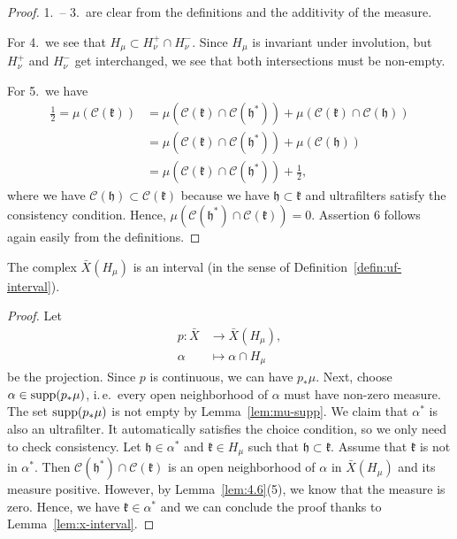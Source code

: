 \begin{proof}
  1.\ -- 3.\ are clear from the definitions and the additivity of the measure.

  For 4.\ we see that \(H_\mu \subset H_\nu^+ \cap H_\nu^-\). Since \(H_\mu\) is invariant under involution, but \(H_\nu^+\) and \(H_\nu^-\) get interchanged, we see that both intersections must be non-empty.

  For 5.\ we have
  \begin{align*}
    \frac{1}{2} = \mu(\mathcal{C}(\mathfrak{k}))
    & = \mu(\mathcal{C}(\mathfrak{k}) \cap \mathcal{C}(\mathfrak{h^\ast})) + \mu(\mathcal{C}(\mathfrak{k}) \cap \mathcal{C}(\mathfrak{h}))\\
    & = \mu(\mathcal{C}(\mathfrak{k}) \cap \mathcal{C}(\mathfrak{h^\ast})) + \mu(\mathcal{C}(\mathfrak{h}))\\
    & = \mu(\mathcal{C}(\mathfrak{k}) \cap \mathcal{C}(\mathfrak{h^\ast})) + \frac{1}{2},
  \end{align*}
  where we have \(\mathcal{C}(\mathfrak{h}) \subset \mathcal{C}(\mathfrak{k})\) because we have \(\mathfrak{h} \subset \mathfrak{k}\) and ultrafilters satisfy the consistency condition. Hence, \(\mu(\mathcal{C}(\mathfrak{h^\ast}) \cap \mathcal{C}(\mathfrak{k})) = 0\). Assertion 6 follows again easily from the definitions.
\end{proof}

\begin{lemma}[{\cite[Lemma 4.7]{MR3509968}}]
  \label{lem:interval}
  The complex \(\bar X(H_\mu)\) is an interval (in the sense of Definition~\ref{defin:uf-interval}).
\end{lemma}

\begin{proof}
  Let
  \begin{align*}
    p \colon \bar X &\to \bar X (H_\mu),\\
    \alpha &\mapsto \alpha \cap H_\mu
  \end{align*}
  be the projection. Since \(p\) is continuous, we can have \(p_\ast\mu\). Next, choose \(\alpha \in \operatorname{supp}(p_\ast \mu)\), i.\,e.\ every open neighborhood of \(\alpha\) must have non-zero measure. The set \(\operatorname{supp}(p_\ast \mu)\) is not empty by Lemma~\ref{lem:mu-supp}. We claim that \(\alpha^\ast\) is also an ultrafilter. It automatically satisfies the choice condition, so we only need to check consistency. Let \(\mathfrak{h} \in \alpha^\ast\) and \(\mathfrak{k} \in H_\mu\) such that \(\mathfrak{h} \subset \mathfrak{k}\). Assume that \(\mathfrak{k}\) is not in \(\alpha^\ast\). Then \(\mathcal{C}(\mathfrak{h^\ast}) \cap \mathcal{C}(\mathfrak{k})\) is an open neighborhood of \(\alpha\) in \(\bar X(H_\mu)\) and its measure positive. However, by Lemma~\ref{lem:4.6}(5), we know that the measure is zero. Hence, we have \(\mathfrak{k} \in \alpha^\ast\) and we can conclude the proof thanks to Lemma~\ref{lem:x-interval}.
\end{proof}

